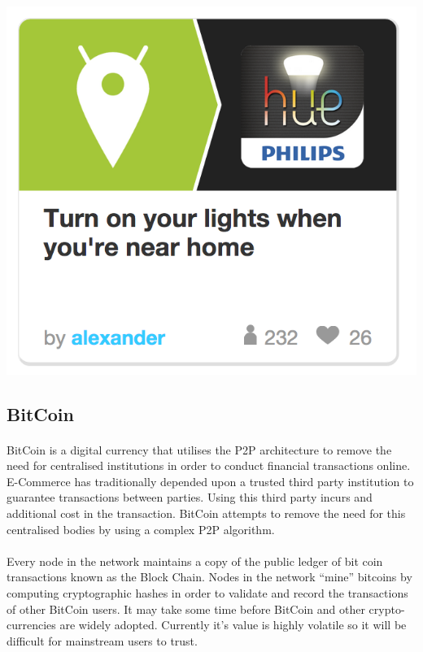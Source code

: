\documentclass[11pt]{amsart}
\begin{document}
\paragraph{}
\includegraphics[scale=1]{IFTTT}



\subsection{BitCoin}\cite{Bitcoin}
\paragraph{}
BitCoin is a digital currency that utilises the P2P architecture to remove the need for centralised institutions in order to conduct financial transactions online. E-Commerce has traditionally depended upon a trusted third party institution to guarantee transactions between parties. Using this third party incurs and additional cost in the transaction. BitCoin attempts to remove the need for this centralised bodies by using a complex P2P algorithm.
\paragraph{}
Every node in the network maintains a copy of the public ledger of bit coin transactions known as the Block Chain. Nodes in the network ``mine'' bitcoins by computing cryptographic hashes in order to validate and record the transactions of other BitCoin users. It may take some time before BitCoin and other crypto-currencies are widely adopted. Currently it's value is highly volatile so it will be difficult for mainstream users to trust.
\end{document}
